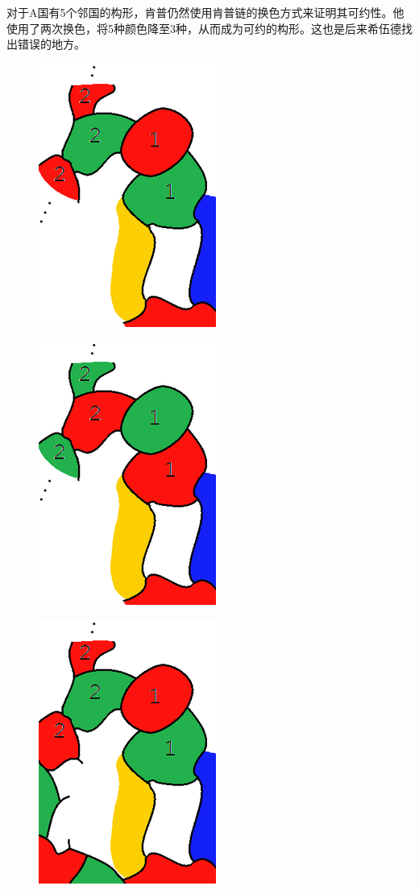 \documentclass[12pt]{article} %
\begin{document}
对于A国有5个邻国的构形，肯普仍然使用肯普链的换色方式来证明其可约性。他使用了两次换色，将5种颜色降至3种，从而成为可约的构形。这也是后来希伍德找出错误的地方。

\begin{figure}[H]
\centering
\includegraphics[scale=0.7]{01.png}
\caption{}
\label{fig:GVT}
\end{figure}

\begin{figure}[H]
\centering
\includegraphics[scale=0.7]{02.png}
\caption{}
\label{fig:GVT}
\end{figure}


\begin{figure}[H]
\centering
\includegraphics[scale=0.7]{03.png}
\caption{}
\label{fig:GVT}
\end{figure}
\end{document}
